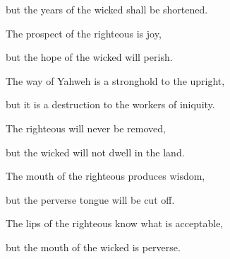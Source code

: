 {\par }{\QB but the years of the wicked shall be shortened.
\par }{\Q {}The prospect of the righteous is joy,
\par }{\QB but the hope of the wicked will perish.
\par }{\Q {}The way of Yahweh is a stronghold to the upright,
\par }{\QB but it is a destruction to the workers of iniquity.
\par }{\Q {}The righteous will never be removed,
\par }{\QB but the wicked will not dwell in the land.
\par }{\Q {}The mouth of the righteous produces wisdom,
\par }{\QB but the perverse tongue will be cut off.
\par }{\Q {}The lips of the righteous know what is acceptable,
\par }{\QB but the mouth of the wicked is perverse.

}
